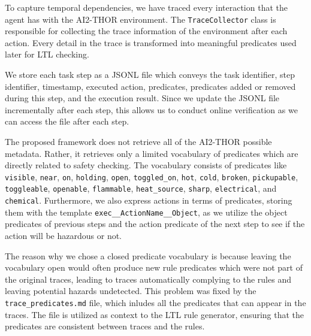 To capture temporal dependencies, we have traced every interaction that the agent has with the AI2-THOR environment. The \texttt{TraceCollector}
class is responsible for collecting the trace information of the environment after each action. Every detail in the trace is transformed
into meaningful predicates used later for LTL checking. 

We store each task step as a JSONL file which conveys the task identifier, step identifier, timestamp, executed action, predicates,
predicates added or removed during this step, and the execution result. Since we update the JSONL file incrementally after each step, 
this allows us to conduct online verification as we can access the file after each step. 

The proposed framework does not retrieve all of the AI2-THOR possible metadata. Rather, it retrieves only a limited vocabulary of predicates
which are directly related to safety checking. The vocabulary consists of predicates like \texttt{visible}, \texttt{near}, 
\texttt{on}, \texttt{holding}, \texttt{open}, \texttt{toggled\_on}, \texttt{hot}, \texttt{cold}, \texttt{broken}, 
\texttt{pickupable}, \texttt{toggleable}, \texttt{openable}, \texttt{flammable}, \texttt{heat\_source}, \texttt{sharp}, 
\texttt{electrical}, and \texttt{chemical}. Furthermore, we also express actions in terms of predicates, storing them with the template
\texttt{exec\_\_ActionName\_\_Object}, as we utilize the object predicates of previous steps and the action predicate of the next step
to see if the action will be hazardous or not.

The reason why we chose a closed predicate vocabulary is because leaving the vocabulary open would often produce new rule predicates which
were not part of the original traces, leading to traces automatically complying to the rules and leaving potential hazards undetected. 
This problem was fixed by the \texttt{trace\_predicates.md} file, which inludes all the predicates that can appear in the traces. The file
is utilized as context to the LTL rule generator, ensuring that the predicates are consistent between traces and the rules.